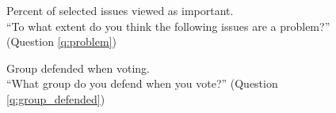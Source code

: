 \begin{figure}[h!]
    \caption[Importance of selected issues]{Percent of selected issues viewed as important.\\ ``To what extent do you think the following issues are a problem?'' (Question \ref{q:problem})}\label{fig:problem}
\end{figure}

\begin{figure}[h!]
    \caption[Group defended when voting]{Group defended when voting. \\ ``What group do you defend when you vote?'' (Question \ref{q:group_defended})}\label{fig:group_defended}
\end{figure}


